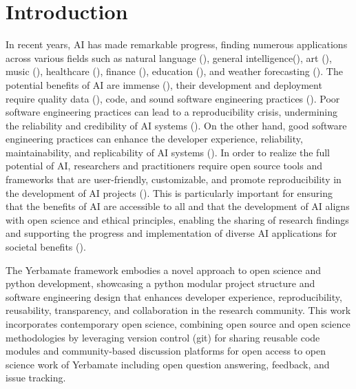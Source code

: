 
\section{Introduction}


 In recent years, AI has made remarkable progress, finding numerous applications across various fields such as natural language (\cite{gpt}), general intelligence(\cite{gato}), art (\cite{diffusion}), music (\cite{musiclm}), healthcare (\cite{aihealthcare}), finance (\cite{bao2022fraudartificial}), education (\cite{aieducation}), and weather forecasting (\cite{weather}). The potential benefits of AI are immense (\cite{beneficialai,potencialaibenefit}), their development and deployment require quality data (\cite{lecun2015deep}), code, and sound software engineering practices (\cite{se4dl,amershi2019software}). Poor software engineering practices can lead to a reproducibility crisis, undermining the reliability and credibility of AI systems (\cite{leakage-recrisis}). On the other hand, good software engineering practices can enhance the developer experience, reliability, maintainability, and replicability of AI systems (\cite{se4dl,amershi2019software, wan2019does}). In order to realize the full potential of AI, researchers and practitioners require open source tools and frameworks that are user-friendly, customizable, and promote reproducibility in the development of AI projects (\cite{lu2022softwareAIReponse,li2018can,wolf2020designing,olson2018system,ong2021guide,gundersen2018reproducible}). This is particularly important for ensuring that the benefits of AI are accessible to all and that the development of AI aligns with open science and ethical principles, enabling the sharing of research findings and supporting the progress and implementation of diverse AI applications for societal benefits (\cite{coro2020open,braun2018open, mittelstadt2016ethics,floridi2018ai4people,ong2021guide}).

The Yerbamate framework embodies a novel approach to open science and python development, showcasing a python modular project structure and software engineering design that enhances developer experience, reproducibility, reusability, transparency, and collaboration in the research community.
This work incorporates contemporary open science, combining open source and open science methodologies by leveraging version control (git) for sharing reusable code modules and community-based discussion platforms for open access to open science work of Yerbamate including open question answering, feedback, and issue tracking. 

